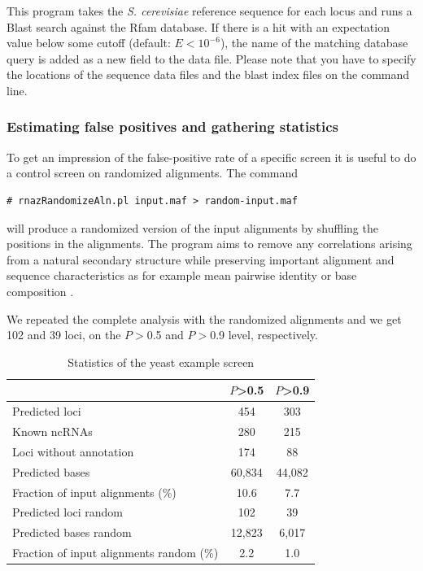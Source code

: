 \documentclass[11pt]{article}
\begin{document}
This program takes the \emph{S. cerevisiae} reference sequence for each
locus and runs a Blast search against the Rfam database.  If there is a hit
with an expectation value below some cutoff (default: $E<10^{-6}$), the
name of the matching database query is added as a new field to the data
file. Please note that you have to specify the locations of the sequence
data files and the blast index files on the command line.


\subsubsection{Estimating false positives and gathering statistics}
\label{sec:estim-false-posit-1}

To get an impression of the false-positive rate of a specific screen it is
useful to do a control screen on randomized alignments. The command

\begin{verbatim}
# rnazRandomizeAln.pl input.maf > random-input.maf
\end{verbatim}

will produce a randomized version of the input alignments by shuffling the
positions in the alignments. The program aims to remove any correlations
arising from a natural secondary structure while preserving important
alignment and sequence characteristics as for example mean pairwise
identity or base composition \cite{washietl04}.

We repeated the complete analysis with the randomized alignments and we get
102 and 39 loci, on the $P>$0.5 and $P>$0.9 level, respectively. 

\begin{table}
  \caption{Statistics of the yeast example screen}

  \begin{center}
    \begin{tabular}{lcc}\toprule
      & $P$>0.5 & $P$>0.9\\
      \midrule
    Predicted loci & 454 & 303\\
    Known ncRNAs & 280 & 215\\
    Loci without annotation & 174 & 88\\
    Predicted bases & 60,834 & 44,082\\
    Fraction of input alignments (\%) & 10.6 & 7.7\\
    Predicted loci random & 102 & 39\\
    Predicted bases random& 12,823 & 6,017\\
    Fraction of input alignments random (\%) & 2.2 & 1.0\\
    \bottomrule
  \end{tabular}
\end{center}
\label{tab:statistics}
\end{table}
\end{document}
